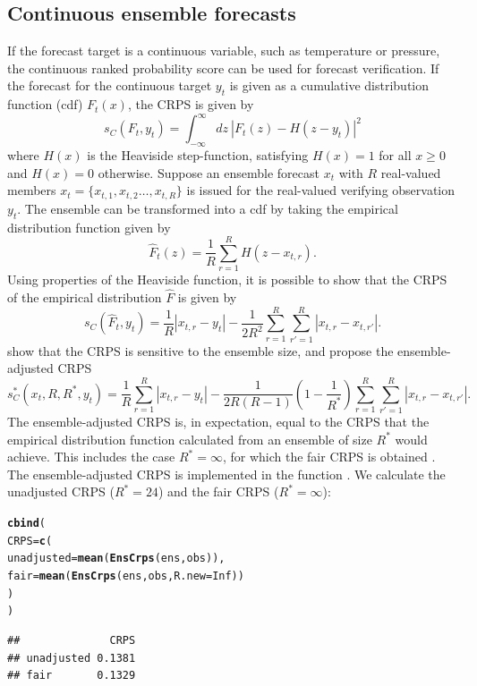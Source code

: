 \documentclass[article]{jss}\usepackage{graphicx, color}
\makeatletter
\newcommand{\hlfunctioncall}[1]{\textcolor[rgb]{0,0.501960784313725,0.752941176470588}{\textbf{#1}}}%
\newenvironment{kframe}{%
 \def\at@end@of@kframe{}%
 \ifinner\ifhmode%
  \def\at@end@of@kframe{\end{minipage}}%
  \begin{minipage}{\columnwidth}%
 \fi\fi%
 \def\FrameCommand##1{\hskip\@totalleftmargin \hskip-\fboxsep
 \colorbox{shadecolor}{##1}\hskip-\fboxsep
     \hskip-\linewidth \hskip-\@totalleftmargin \hskip\columnwidth}%
 \MakeFramed {\advance\hsize-\width
   \@totalleftmargin\z@ \linewidth\hsize
   \@setminipage}}%
 {\par\unskip\endMakeFramed%
 \at@end@of@kframe}
\newenvironment{knitrout}{}{} %
\makeatother
\begin{document}
\subsection{Continuous ensemble forecasts}


If the forecast target is a continuous variable, such as temperature or pressure, the continuous ranked probability score \citep[CRPS;][]{matheson1976scoring} can be used for forecast verification.
If the forecast for the continuous target $y_t$ is given as a cumulative distribution function (cdf) $F_t(x)$, the CRPS is given by 
%
\begin{equation}
s_{C}(F_t, y_t) = \int_{-\infty}^\infty dz\ \left|F_t(z) - H(z-y_t)\right|^2
\label{eq:crps}
\end{equation}
%
where $H(x)$ is the Heaviside step-function, satisfying $H(x)=1$ for all $x\ge 0$ and $H(x)=0$ otherwise.
Suppose an ensemble forecast $x_t$ with $R$ real-valued members $x_t = \{x_{t,1}, x_{t,2} \dots, x_{t,R}\}$ is issued for the real-valued verifying observation $y_t$.
The ensemble can be transformed into a cdf by taking the empirical distribution function given by 
%
\begin{equation}
\hat{F}_t(z) = \frac{1}{R} \sum_{r=1}^{R} H(z - x_{t,r}).
\end{equation}
%
Using properties of the Heaviside function, it is possible to show that the CRPS of the empirical distribution $\hat{F}$ is given by
%
\begin{equation}
s_{C}(\hat{F}_t, y_t) = \frac{1}{R}|x_{t,r}-y_t| - \frac{1}{2R^2} \sum_{r=1}^R \sum_{r'=1}^R |x_{t,r}-x_{t,r'}|.
\end{equation}
%
\citet{fricker2013three} show that the CRPS is sensitive to the ensemble size, and propose the ensemble-adjusted CRPS
%
\begin{equation}
s_{C}^*(x_t, R, R^*, y_t) = \frac{1}{R}\sum_{r=1}^R |x_{t,r} - y_t| - \frac{1}{2R(R-1)}\left(1-\frac{1}{R^*}\right) \sum_{r=1}^R\sum_{r'=1}^R |x_{t,r}-x_{t,r'}|.
\end{equation}
%
The ensemble-adjusted CRPS is, in expectation, equal to the CRPS that the empirical distribution function calculated from an ensemble of size $R^*$ would achieve.
This includes the case $R^*=\infty$, for which the fair CRPS is obtained \citep{fricker2013three}.
The ensemble-adjusted CRPS is implemented in the  function .
We calculate the unadjusted CRPS ($R^*=24$) and the fair CRPS ($R^*=\infty$):
%
\begin{knitrout}
\color{fgcolor}\begin{kframe}
\begin{alltt}
\hlfunctioncall{cbind}(
 CRPS=\hlfunctioncall{c}(
  unadjusted = \hlfunctioncall{mean}(\hlfunctioncall{EnsCrps}(ens, obs)), 
  fair       = \hlfunctioncall{mean}(\hlfunctioncall{EnsCrps}(ens, obs, R.new=Inf))
 )
)
\end{alltt}
\begin{verbatim}
##              CRPS
## unadjusted 0.1381
## fair       0.1329
\end{verbatim}
\end{kframe}
\end{knitrout}
\end{document}
